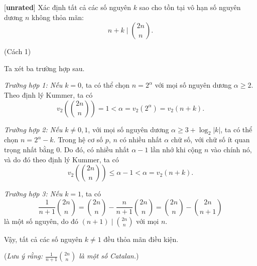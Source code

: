 \documentclass[../05-largest-exponent.tex]{subfiles}
\begin{document}
\begin{example*}\label{example:CHN-2015-P4}[\textbf{unrated}]
	Xác định tất cả các số nguyên \( k \) sao cho tồn tại vô hạn số nguyên dương \( n \) không thỏa mãn:
	\[
		n + k \mid \binom{2n}{n}.
	\]
\end{example*}

\begin{soln}(Cách 1)\footnotemark

	Ta xét ba trường hợp sau.
	
	\textit{Trường hợp 1: Nếu \( k = 0 \)}, ta có thể chọn \( n = 2^\alpha \) với mọi số nguyên dương \( \alpha \geq 2 \).  
	Theo định lý Kummer, ta có
	\[
		v_2\left( \binom{2n}{n} \right) = 1 < \alpha = v_2(2^\alpha) = v_2(n + k).
	\]
		
	\textit{Trường hợp 2: Nếu \( k \neq 0,1 \)}, với mọi số nguyên dương \( \alpha \geq 3 + \log_2 |k| \), ta có thể chọn  
	\( n = 2^\alpha - k \). Trong hệ cơ số \( p \), \( n \) có nhiều nhất \( \alpha \) chữ số, với chữ số ít quan trọng nhất bằng 0.  
	Do đó, có nhiều nhất \( \alpha-1 \) lần nhớ khi cộng \( n \) vào chính nó\footnotemark, và do đó theo định lý Kummer, ta có  
	\[
		v_2\left( \binom{2n}{n} \right) \leq \alpha - 1 < \alpha = v_2(n + k).
	\]
		
	\textit{Trường hợp 3: Nếu \( k = 1 \)}, ta có  
	\[
		\frac{1}{n+1} \binom{2n}{n} = \binom{2n}{n} - \frac{n}{n+1} \binom{2n}{n} = \binom{2n}{n} - \binom{2n}{n+1}
	\]
	là một số nguyên, do đó \( (n+1) \mid \binom{2n}{n} \) với mọi \( n \).  

	Vậy, tất cả các số nguyên \( k \neq 1 \) đều thỏa mãn điều kiện.

	(\textit{Lưu ý rằng: \( \frac{1}{n+1} \binom{2n}{n} \) là một số Catalan.})
\end{soln}

\end{document}
